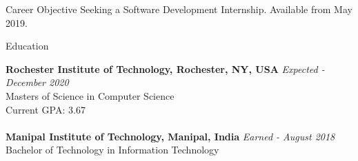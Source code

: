 \documentclass{resume} %
\begin{document}
\begin{rSection}{Career Objective}
 Seeking a Software Development Internship. Available from May 2019.
\end{rSection}

\begin{rSection}{Education}

{\bf Rochester Institute of Technology, Rochester, NY, USA} \hfill {\em Expected - December 2020} 
\\ Masters of Science in Computer Science
\\ Current GPA: 3.67
\\
\\{\bf Manipal Institute of Technology, Manipal, India             } \hfill {\em Earned - August 2018} 
\\ Bachelor of Technology in Information Technology
\end{rSection}
\end{document}
